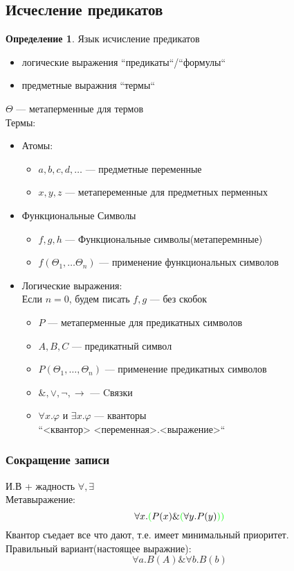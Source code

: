 \documentclass[english]{article}
\theoremstyle{plain}
\theoremstyle{remark}
\theoremstyle{definition}
\newtheorem*{definition}{Определение}
\begin{document}
\subsection{Исчесление предикатов}
\label{sec:org8348991}
\begin{definition}
Язык исчисление предикатов
\begin{itemize}
\item логические выражения ``предикаты``/``формулы``
\item предметные выражния ``термы``
\end{itemize}
\(\Theta\) --- метаперменные для термов \\
Термы:
\begin{itemize}
\item Атомы:
\begin{itemize}
\item \(a, b, c, d, \dots\) --- предметные переменные
\item \(x, y, z\) --- метапеременные для предметных перменных
\end{itemize}
\item Функциональные Символы
\begin{itemize}
\item \(f, g, h\) --- Функциональные символы(метаперемнные)
\item \(f(\Theta_1, \dots \Theta_n)\) --- применение функциональных символов
\end{itemize}
\item Логические выражения: \\
\color{gray}Если \(n = 0\), будем писать \(f, g\) --- без скобок\color{black}
\begin{itemize}
\item \(P\) --- метаперменные для предикатных символов
\item \(A, B, C\) --- предикатный символ
\item \(P(\Theta_1, \dots, \Theta_n)\) --- применение предикатных символов
\item \(\&, \vee, \neg, \to\) --- Cвязки
\item \(\forall x.\varphi\) и \(\exists x.\varphi\) --- кванторы \\
\color{gray}``<квантор> <переменная>.<выражение>``\color{black} \\
\end{itemize}
\end{itemize}
\end{definition}
\subsubsection{Сокращение записи}
\label{sec:orgba6c8ec}
И.В + жадность \(\forall, \exists\) \\
Метавыражение:
\[ \forall x. \color{green}(\color{black}P(x) \& \color{green}(\color{black}\forall y. P(y) \color{green}))\color{black} \]
Квантор съедает все что дают, т.е. имеет минимальный приоритет. \\
Правильный вариант(настоящее выражние):
\[ \forall a. B(A) \& \forall b. B(b) \]
\end{document}
